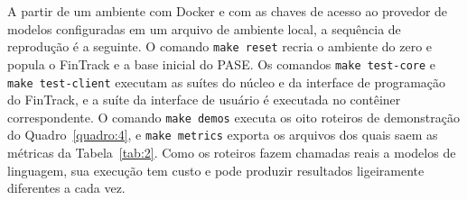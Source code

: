 \begin{apendicesenv}
A partir de um ambiente com Docker e com as chaves de acesso ao provedor de modelos configuradas em um arquivo de ambiente local, a sequência de reprodução é a seguinte. O comando \texttt{make reset} recria o ambiente do zero e popula o FinTrack e a base inicial do PASE. Os comandos \texttt{make test-core} e \texttt{make test-client} executam as suítes do núcleo e da interface de programação do FinTrack, e a suíte da interface de usuário é executada no contêiner correspondente. O comando \texttt{make demos} executa os oito roteiros de demonstração do Quadro~\ref{quadro:4}, e \texttt{make metrics} exporta os arquivos dos quais saem as métricas da Tabela~\ref{tab:2}. Como os roteiros fazem chamadas reais a modelos de linguagem, sua execução tem custo e pode produzir resultados ligeiramente diferentes a cada vez.

\end{apendicesenv}
